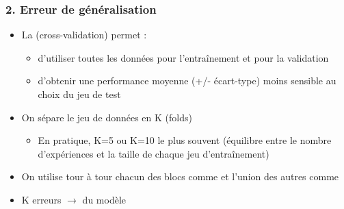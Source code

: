 \begin{frame}
  \frametitle{2. Erreur de généralisation}
  \begin{itemize}
  \item La  \textcolor{gray!70}{(cross-validation)} permet :
    \begin{itemize}
    \item d'utiliser toutes les données pour l'entraînement et pour la validation
    \item d'obtenir une performance moyenne (+/- écart-type)  moins sensible au choix du jeu de test
    \end{itemize}
  \item On sépare le jeu de données en K  \textcolor{gray!70}{(folds)}
    \begin{itemize}
    \item[] En pratique, K=5 ou K=10 le plus souvent (équilibre entre le nombre
      d'expériences et la taille de chaque jeu d'entraînement)
    \end{itemize}
  \item On utilise tour à tour chacun des blocs comme  et l'union des autres comme 
  \item[$\Rightarrow$] K erreurs $\rightarrow$  du modèle
  \end{itemize}
\end{frame}


